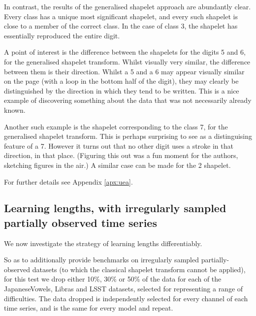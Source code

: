 \documentclass{article}
\theoremstyle{plain}
\theoremstyle{definition}
\begin{document}
In contrast, the results of the generalised shapelet approach are abundantly clear. Every class has a unique most significant shapelet, and every such shapelet is close to a member of the correct class. In the case of class 3, the shapelet has essentially reproduced the entire digit.


A point of interest is the difference between the shapelets for the digits 5 and 6, for the generalised shapelet transform. Whilst visually very similar, the difference between them is their direction. Whilst a 5 and a 6 may appear visually similar on the page (with a loop in the bottom half of the digit), they may clearly be distinguished by the direction in which they tend to be written. This is a nice example of discovering something about the data that was not necessarily already known.

Another such example is the shapelet corresponding to the class 7, for the generalised shapelet transform. This is perhaps surprising to see as a distinguising feature of a 7. However it turns out that no other digit uses a stroke in that direction, in that place. (Figuring this out was a fun moment for the authors, sketching figures in the air.) A similar case can be made for the 2 shapelet.

For further details see Appendix \ref{apx:uea}.

\subsection{Learning lengths, with irregularly sampled partially observed time series} \label{subsec:uea_missing_and_length}
We now investigate the strategy of learning lengths differentiably.

So as to additionally provide benchmarks on irregularly sampled partially-observed datasets (to which the classical shapelet transform cannot be applied), for this test we drop either 10\%, 30\% or 50\% of the data for each of the JapaneseVowels, Libras and LSST datasets, selected for representing a range of difficulties. The data dropped is independently selected for every channel of each time series, and is the same for every model and repeat.
\end{document}
